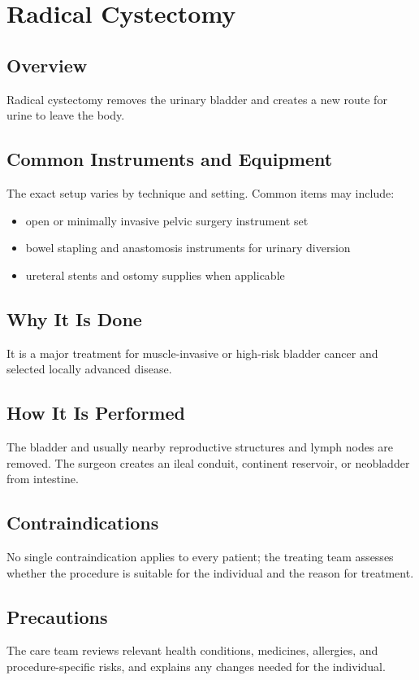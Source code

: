\chapter{Radical Cystectomy}
\section*{Overview}
Radical cystectomy removes the urinary bladder and creates a new route for urine to leave the body.
\section*{Common Instruments and Equipment}
The exact setup varies by technique and setting. Common items may include:
\begin{itemize}[nosep,leftmargin=*]
  \item open or minimally invasive pelvic surgery instrument set
  \item bowel stapling and anastomosis instruments for urinary diversion
  \item ureteral stents and ostomy supplies when applicable
\end{itemize}

\section*{Why It Is Done}
It is a major treatment for muscle-invasive or high-risk bladder cancer and selected locally advanced disease.
\section*{How It Is Performed}
The bladder and usually nearby reproductive structures and lymph nodes are removed. The surgeon creates an ileal conduit, continent reservoir, or neobladder from intestine.
\section*{Contraindications}
No single contraindication applies to every patient; the treating team assesses whether the procedure is suitable for the individual and the reason for treatment.

\section*{Precautions}
The care team reviews relevant health conditions, medicines, allergies, and procedure-specific risks, and explains any changes needed for the individual.

